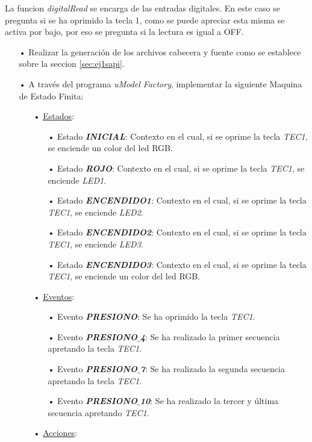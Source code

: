 \documentclass[12pt,letterpaper]{article}
\begin{document}
La funcion \textit{digitalRead} se encarga de las entradas digitales. En este caso se pregunta  si se ha oprimido la tecla 1, como se puede apreciar esta misma se activa por bajo, por eso se pregunta si la lectura es igual a OFF.

\begin{enumerate}
\item[•]Realizar la generación de los archivos cabecera y fuente como se establece sobre la seccion \ref{sec:ej1sapi}.

\item[•] A través del programa \textit{uModel Factory}, implementar la siguiente Maquina de Estado Finita:

\begin{enumerate}
\item[•]\underline{Estados}:
\begin{enumerate}
\item[•]Estado \textit{\textbf{INICIAL}}: Contexto en el cual, si se oprime la tecla \textit{TEC1}, se enciende un color del led RGB.
\item[•]Estado \textit{\textbf{ROJO}}: Contexto en el cual, si se oprime la tecla \textit{TEC1}, se enciende \textit{LED1}. 
\item[•]Estado \textit{\textbf{ENCENDIDO1}}: Contexto en el cual, si se oprime la tecla \textit{TEC1}, se enciende \textit{LED2}.
\item[•]Estado \textit{\textbf{ENCENDIDO2}}: Contexto en el cual, si se oprime la tecla \textit{TEC1}, se enciende \textit{LED3}.
\item[•]Estado \textit{\textbf{ENCENDIDO3}}: Contexto en el cual, si se oprime la tecla \textit{TEC1}, se enciende un color del led RGB.
\end{enumerate}
\item[•]\underline{Eventos}:
\begin{enumerate}
\item[•]Evento \textit{\textbf{PRESIONO}}: Se ha oprimido la tecla \textit{TEC1}.
\item[•]Evento \textit{\textbf{PRESIONO$\_$4}}: Se ha realizado la primer secuencia apretando la tecla \textit{TEC1}.
\item[•]Evento \textit{\textbf{PRESIONO$\_$7}}: Se ha realizado la segunda secuencia apretando la tecla \textit{TEC1}.
\item[•]Evento \textit{\textbf{PRESIONO$\_$10}}: Se ha realizado la tercer y última secuencia apretando \textit{TEC1}.
\end{enumerate}
\item[•]\underline{Acciones}:

\end{enumerate}
\end{enumerate}
\end{document}
